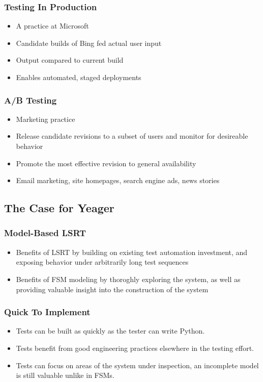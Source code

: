 \begin{frame}
  \frametitle{Testing In Production}
  \begin{itemize}
    \item A practice at Microsoft \citep{AndrewsHeal}
    \item Candidate builds of Bing fed actual user input
    \item Output compared to current build
    \item Enables automated, staged deployments
  \end{itemize}
\end{frame}

\begin{frame}
  \frametitle{A/B Testing}
  \begin{itemize}
    \item Marketing practice
    \item Release candidate revisions to a subset of users and monitor for desireable behavior
    \item Promote the most effective revision to general availability
    \item Email marketing, site homepages, search engine ads, news stories
  \end{itemize}
  \citep{HBR2017ABTest}
\end{frame}

\subsection{The Case for Yeager}

\begin{frame}
  \frametitle{Model-Based LSRT}
  \begin{itemize}
    \item Benefits of LSRT by building on existing test automation investment, and exposing behavior under arbitrarily long test sequences
    \item Benefits of FSM modeling by thoroghly exploring the system, as well as providing valuable insight into the construction of the system
  \end{itemize}
\end{frame}

\begin{frame}
  \frametitle{Quick To Implement}
  \begin{itemize}
    \item Tests can be built as quickly as the tester can write Python.
    \item Tests benefit from good engineering practices elsewhere in the testing effort.
    \item Tests can focus on areas of the system under inspection, an incomplete model is still valuable unlike in FSMs.
  \end{itemize}
\end{frame}

